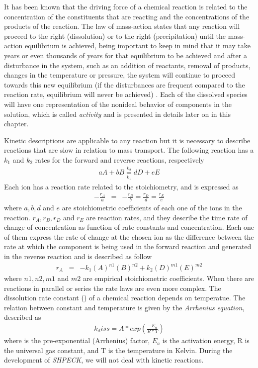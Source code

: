 \documentclass[ppgc,mestrado,English]{iiufrgs}
\begin{document}
It has been known that the driving force of a chemical reaction is related to the concentration of the constituents that are reacting and the concentrations of the products of the reaction. The law of mass-action states that any reaction will proceed to the right (dissolution) or to the right (precipitation) until the mass-action equilibrium is achieved, being important to keep in mind that it may take years or even thousands of years for that equilibrium to be achieved and after a disturbance in the system, such as an addition of reactants, removal of products, changes in the temperature or pressure, the system will continue to proceed towards this new equilibrium (if the disturbances are frequent compared to the reaction rate, equilibrium will never be achieved) \cite{Freeze:79}. Each of the dissolved species will have one representation of the nonideal behavior of components in the solution, which is called \emph{activity} and is presented in details later on in this chapter.

Kinetic descriptions are applicable to any reaction but it is necessary to describe  reactions that are slow in relation to mass transport.  The following reaction has a $k_1$ and $k_2$ rates for the forward and reverse reactions, respectively 
\begin{eqnarray}
aA + bB \underset{k_1}{\overset{k_2}{=}} dD + eE 
\end{eqnarray}
Each ion has a reaction rate related to the stoichiometry, and is expressed as
\begin{eqnarray}
-\frac{r_A}{a} &=& -\frac{r_B}{b} = \frac{r_D}{d} = \frac{r_E}{e}
\end{eqnarray}
where $a, b, d$ and $e$ are stoichiometric coefficients of each one of the ions in the reaction. $r_A, r_B, r_D$ and $r_E$ are reaction rates, and they describe the time rate of change of concentration as function of rate constants and concentration. Each one of them express the rate of change at the chosen ion as the difference between the rate at which the component is being used in the forward reaction and generated in the reverse reaction and is described as follow
\begin{eqnarray}
r_A &=& - k_1 (A)^{n1}(B)^{n2} + k_2 (D)^{m1}(E)^{m2}
\end{eqnarray}
where $n1, n2, m1$ and $m2$ are empirical stoichiometric coefficients. When there are reactions in parallel or series the rate laws are even more complex.
The dissolution rate constant () of a chemical reaction depends on temperatue. The relation between constant and temperature is given by the \emph{Arrhenius equation}, described as
\begin{eqnarray}
k_diss = A * exp(\frac{-E_a}{R*T})
\end{eqnarray}
where  is the pre-exponential (Arrhenius) factor, $E_a$ is the activation energy, R is the universal gas constant, and T is the temperature in Kelvin.
During the development of \emph{SHPECK}, we will not deal with kinetic reactions.
\end{document}
